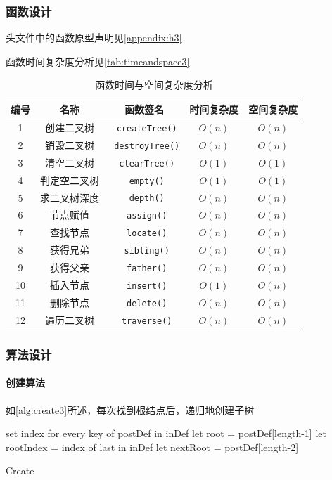 \subsubsection{函数设计}
头文件中的函数原型声明见\autoref{appendix:h3}
\par
函数时间复杂度分析见\autoref{tab:timeandspace3}
\begin{table}[Htb]
\centering
\caption{函数时间与空间复杂度分析}
\label{tab:timeandspace3}
\begin{tabular}{@{}ccccc@{}}
\toprule
编号                          & 名称  & 函数签名 & 时间复杂度 & 空间复杂度 \\ \toprule
    \multicolumn{1}{c|}{1}  & 创建二叉树 & \texttt{ createTree()} & $O(n)$ &  $O(n)$ \\
    \multicolumn{1}{c|}{2}  & 销毁二叉树& \texttt{ destroyTree()} & $O(n)$ &  $O(n)$ \\
    \multicolumn{1}{c|}{3}  & 清空二叉树& \texttt{ clearTree()} & $O(1)$ &  $O(1)$   \\
    \multicolumn{1}{c|}{4}  & 判定空二叉树& \texttt{ empty()} & $O(1)$ &  $O(1)$     \\
    \multicolumn{1}{c|}{5}  & 求二叉树深度 & \texttt{ depth()} & $O(n)$ &  $O(n)$     \\
    \multicolumn{1}{c|}{6}  & 节点赋值 & \texttt{ assign()} & $O(n)$ &  $O(n)$      \\
    \multicolumn{1}{c|}{7}  & 查找节点 & \texttt{ locate()} & $O(n)$ &  $O(n)$   \\
    \multicolumn{1}{c|}{8}  & 获得兄弟 & \texttt{ sibling()} & $O(n)$ &  $O(n)$    \\
    \multicolumn{1}{c|}{9}  & 获得父亲 & \texttt{ father()} & $O(n)$ &  $O(n)$     \\
    \multicolumn{1}{c|}{10}  & 插入节点 & \texttt{ insert()} & $O(1)$ &  $O(n)$  \\
    \multicolumn{1}{c|}{11}  & 删除节点 & \texttt{ delete()} & $O(n)$ &  $O(n)$  \\
    \multicolumn{1}{c|}{12}  & 遍历二叉树 & \texttt{ traverse()}   & $O(n)$ & $O(n)$ \\ \bottomrule
\end{tabular}
\end{table}
\subsubsection{算法设计}
\paragraph{创建算法}如\autoref{alg:create3}所述，每次找到根结点后，递归地创建子树
\par
\begin{algorithm}[H]
    \SetAlgoLined
    set index for every key of postDef in inDef\;
    let root = postDef[length-1]\;
    let rootIndex = index of last in inDef\;
    let nextRoot = postDef[length-2]\;
    \caption{Create}\label{alg:create3}
\end{algorithm}
